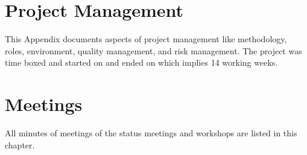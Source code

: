 \documentclass[hsr-ba,english]{hgbthesis}
\begin{document}
\appendix

\chapter{Project Management}
\label{cha:projectmgmt}

This Appendix documents aspects of project management like methodology, roles, environment, quality management, and risk management. The project was time boxed and started on  and ended on  which implies 14 working weeks. 




\chapter{Meetings}

All minutes of meetings of the status meetings and workshops are listed in
this chapter.




%
%
%


%



\printglossaries


\MakeBibliography
\end{document}
